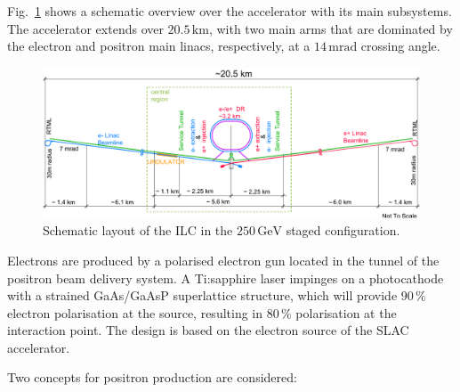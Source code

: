 \documentclass[%
 reprint,
 amsmath,amssymb,
 aps,
]{revtex4-1}
\def\Fig#1{Fig.~\ref{#1}}
\begin{document}
\Fig{fig_ilc-schematic} shows a schematic overview over the accelerator with its main subsystems.
The accelerator extends over $20.5\,{\mathrm{km}}$, with two main arms that are dominated by the electron and positron main linacs, respectively, at a $14\,{\mathrm{mrad}}$ crossing angle.

 \begin{figure}[tb]
 \begin{center}
 \includegraphics[width=\hsize]{figures/TDR-machine-layout-cartoon-staged.pdf}
\caption{Schematic layout of the ILC in the $250\,{\mathrm{GeV}}$ staged configuration.
\label{fig_ilc-schematic}}
 \end{center}
 \end{figure}

Electrons are produced by a polarised electron gun located in the tunnel of the positron beam delivery system. A Ti:sapphire laser impinges on a photocathode with a strained GaAs/GaAsP superlattice structure, which will provide  $90\,\%$ electron polarisation at the source, resulting in $80\,\%$ polarisation at the interaction point. The design is based on the electron source of the SLAC accelerator. 

Two concepts for positron production are considered:
\end{document}
